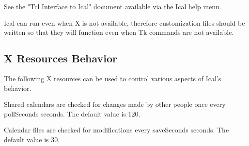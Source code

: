 \documentclass[a4paper,english]{article}
\begin{document}
        See the "Tcl Interface to Ical" document available via the
        Ical help menu.

        Ical can run even when X is not available, therefore
        customization files should be written so that they will
        function even when Tk commands are not available.

    \subsection{X Resources Behavior}
        \begin{Description}\setlength{\itemsep}{0cm}
        The following X resources can be used to control various
        aspects of Ical's behavior.

        \item[Ical.pollSeconds]
            Shared calendars are checked for changes made by other
            people once every pollSeconds seconds.  The default value
            is 120.

        \item[Ical.saveSeconds]
            Calendar files are checked for modifications every
            saveSeconds seconds. The default value is 30.

        \end{Description}
\end{document}
